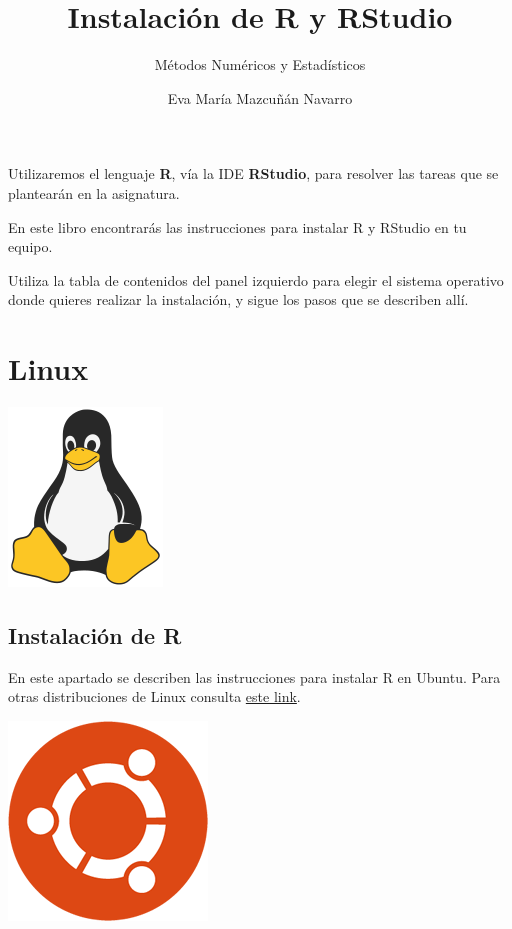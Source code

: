 \documentclass[]{book}
\title{Instalación de R y RStudio}
\subtitle{Métodos Numéricos y Estadísticos}
\author{Eva María Mazcuñán Navarro}
\date{}
\begin{document}
\maketitle

{
\setcounter{tocdepth}{1}
\tableofcontents
}
\hypertarget{section}{%
\chapter*{}\label{section}}

Utilizaremos el lenguaje \textbf{R}, vía la IDE \textbf{RStudio}, para resolver las tareas que se plantearán en la asignatura.

En este libro encontrarás las instrucciones para instalar R y RStudio en tu equipo.

Utiliza la tabla de contenidos del panel izquierdo para elegir el sistema operativo donde quieres realizar la instalación, y sigue los pasos que se describen allí.

\hypertarget{linux}{%
\chapter{Linux}\label{linux}}

\begin{center}\includegraphics[width=0.15\linewidth]{images/os/tux-flat} \end{center}

\hypertarget{instalaciuxf3n-de-r}{%
\section{Instalación de R}\label{instalaciuxf3n-de-r}}

En este apartado se describen las instrucciones para instalar R en Ubuntu. Para otras distribuciones de Linux consulta \href{https://ftp.cixug.es/CRAN/bin/linux/}{este link}.

\begin{center}\includegraphics[width=0.15\linewidth]{images/os/ubuntu} \end{center}
\end{document}
